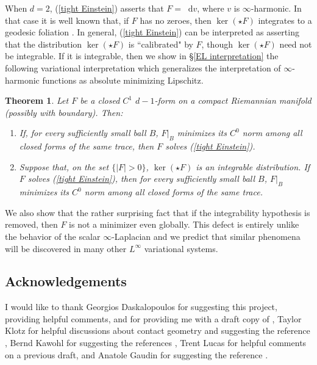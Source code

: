 \documentclass[reqno,11pt]{amsart}
\newcommand*\dif{\mathop{}\!\mathrm{d}}
\newtheorem{mainthm}{Theorem}
\theoremstyle{definition}
\numberwithin{equation}{section}
\begin{document}
When $d = 2$, (\ref{tight Einstein}) asserts that $F = \dif v$, where $v$ is $\infty$-harmonic.
In that case it is well known that, if $F$ has no zeroes, then $\ker(\star F)$ integrates to a geodesic foliation \cite[Proof of Theorem 1.5]{Sheffield12}.
In general, (\ref{tight Einstein}) can be interpreted as asserting that the distribution $\ker(\star F)$ is ``calibrated" by $F$, though $\ker(\star F)$ need not be integrable.
If it is integrable, then we show in \S\ref{EL interpretation} the following variational interpretation which generalizes the interpretation of $\infty$-harmonic functions as absolute minimizing Lipschitz.

\begin{mainthm}\label{tight are absolute minimizers}
Let $F$ be a closed $C^1$ $d - 1$-form on a compact Riemannian manifold (possibly with boundary). Then:
\begin{enumerate}
\item If, for every sufficiently small ball $B$, $F|_B$ minimizes its $C^0$ norm among all closed forms of the same trace, then $F$ solves (\ref{tight Einstein}).
\item Suppose that, on the set $\{|F| > 0\}$, $\ker(\star F)$ is an integrable distribution.
If $F$ solves (\ref{tight Einstein}), then for every sufficiently small ball $B$, $F|_B$ minimizes its $C^0$ norm among all closed forms of the same trace.
\end{enumerate}
\end{mainthm}

We also show that the rather surprising fact that if the integrability hypothesis is removed, then $F$ is not a minimizer even globally.
This defect is entirely unlike the behavior of the scalar $\infty$-Laplacian and we predict that similar phenomena will be discovered in many other $L^\infty$ variational systems.

\subsection{Acknowledgements}
I would like to thank Georgios Daskalopoulos for suggesting this project, providing helpful comments, and for providing me with a draft copy of \cite{daskalopoulos2023}, Taylor Klotz for helpful discussions about contact geometry and suggesting the reference \cite{Peralta_Salas_2023}, Bernd Kawohl for suggesting the references \cite{Kawohl2003, Grieser05}, Trent Lucas for helpful comments on a previous draft, and Anatole Gaudin for suggesting the reference \cite{Costabel2010}.
\end{document}
